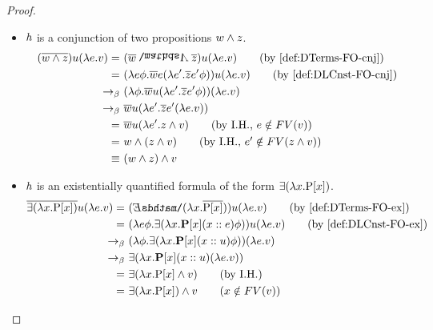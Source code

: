 \begin{proof}
\begin{itemize}
\item $\h1$ is a conjunction of two propositions $\w1 \land \z1$.
\begin{align}
(\tr{\w1 \land \z1}) \u1 (\lambda e. \v1)  = \ & (\tr{\w1} \cnj2 \tr{\z1}) \u1 (\lambda e. \v1)   \tag{by~\eqref{def:DTerms-FO-cnj}} \\
 = \ & (\lambda e\phi. \tr{\w1} e (\lambda e'. \tr{\z1} e' \phi) ) \u1 (\lambda e. \v1)   \tag{by~\eqref{def:DLCnst-FO-cnj}} \\
\bconv \ & (\lambda \phi. \tr{\w1} \u1 (\lambda e'. \tr{\z1} e' \phi) ) (\lambda e. \v1)   \notag \\
\bconv \ &  \tr{\w1} \u1 (\lambda e'. \tr{\z1} e'  (\lambda e. \v1) )  \notag \\
= \ &  \tr{\w1} \u1 (\lambda e'. \z1 \land \v1)  \tag{by I.H., $e \notin FV(\v1)$} \\
= \ &  \w1 \land (\z1 \land \v1)  \tag{by I.H., $e' \notin FV(\z1 \land \v1)$} \\
\logeq \ & (\w1 \land \z1) \land \v1 \notag
\end{align}

\item $\h1$ is an existentially quantified formula of the form $\exists( \lambda \x1. \P1 [\x1])$.
\begin{align}
\tr{\exists ( \lambda \x1. \P1 [\x1])} \u1 (\lambda e. \v1)  = \ & ( \ex2 ( \lambda \x1. \tr{\P1 [\x1]})  ) \u1 (\lambda e. \v1)   \tag{by~\eqref{def:DTerms-FO-ex}} \\
 = \ & ( \lambda e \phi. \exists ( \lambda \x1. \P2 [\x1] (x::e) \phi  )) \u1 (\lambda e. \v1)   \tag{by~\eqref{def:DLCnst-FO-ex}} \\
\bconv \ & ( \lambda  \phi. \exists ( \lambda \x1. \P2 [\x1] (x::\u1) \phi  ))  (\lambda e. \v1)  \notag \\
\bconv \ & \exists ( \lambda \x1. \P2 [\x1] (x::\u1) (\lambda e. \v1)  )  \notag \\
= \ & \exists ( \lambda \x1. \P1 [\x1] \land \v1  )  \tag{by I.H.} \\
= \ & \exists ( \lambda \x1. \P1 [\x1]) \land \v1    \tag{$\x1 \notin FV(\v1)$} 
\end{align}

\end{itemize}
\end{proof}


